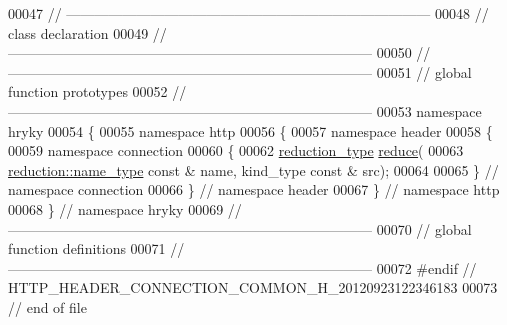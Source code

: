 \begin{DoxyCode}
00047 \textcolor{comment}{//
      ------------------------------------------------------------------------------}
00048 \textcolor{comment}{// class declaration}
00049 \textcolor{comment}{//
      ------------------------------------------------------------------------------}
00050 \textcolor{comment}{//
      ------------------------------------------------------------------------------}
00051 \textcolor{comment}{// global function prototypes}
00052 \textcolor{comment}{//
      ------------------------------------------------------------------------------}
00053 \textcolor{keyword}{namespace }hryky
00054 \{
00055 \textcolor{keyword}{namespace }http
00056 \{
00057 \textcolor{keyword}{namespace }header
00058 \{
00059 \textcolor{keyword}{namespace }connection
00060 \{
00062     \hyperlink{namespacehryky_a343a9a4c36a586be5c2693156200eadc}{reduction_type} \hyperlink{namespacehryky_1_1http_a08fc36a78a8e2908140fcd102829a566}{reduce}(
00063         \hyperlink{namespacehryky_1_1reduction_ac686c30a4c8d196bbd0f05629a6b921f}{reduction::name_type} \textcolor{keyword}{const} & name, kind\_type \textcolor{keyword}{const} & src);
00064 
00065 \} \textcolor{comment}{// namespace connection}
00066 \} \textcolor{comment}{// namespace header}
00067 \} \textcolor{comment}{// namespace http}
00068 \} \textcolor{comment}{// namespace hryky}
00069 \textcolor{comment}{//
      ------------------------------------------------------------------------------}
00070 \textcolor{comment}{// global function definitions}
00071 \textcolor{comment}{//
      ------------------------------------------------------------------------------}
00072 \textcolor{preprocessor}{#endif // HTTP\_HEADER\_CONNECTION\_COMMON\_H\_20120923122346183}
00073 \textcolor{preprocessor}{}\textcolor{comment}{// end of file}
\end{DoxyCode}
